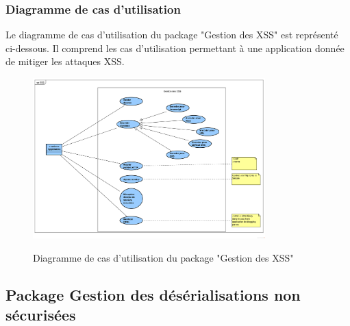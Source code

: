 \subsubsection{Diagramme de cas d'utilisation}
Le diagramme de cas d'utilisation du package "Gestion des XSS" est représenté ci-dessous. Il comprend les cas d'utilisation permettant à une application donnée de mitiger les attaques XSS.\\ 
\begin{figure}[H]
	\centering
	\begin{minipage}{18cm}
		\centering
		{\includegraphics[width=0.8\textwidth,height=0.30\textheight]{fig/XSS-use-case-diagram.png}}
	\end{minipage}
	\caption{Diagramme de cas d'utilisation du package "Gestion des XSS"}
	\label{fig:7.8}
\end{figure}

\subsection{Package Gestion des désérialisations non sécurisées}
